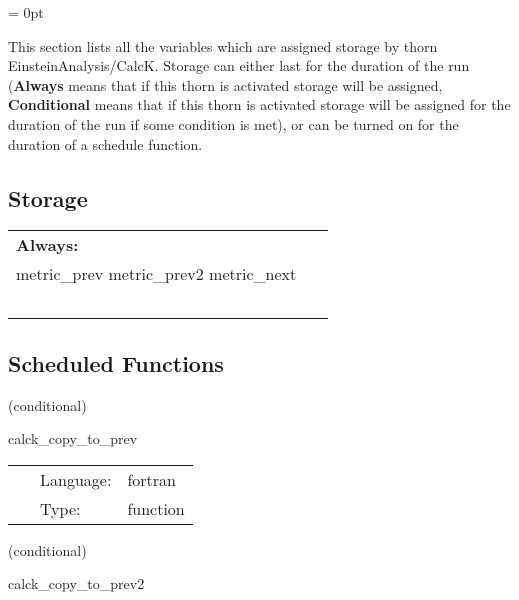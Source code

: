 \parskip = 0pt


\noindent This section lists all the variables which are assigned storage by thorn EinsteinAnalysis/CalcK.  Storage can either last for the duration of the run ({\bf Always} means that if this thorn is activated storage will be assigned, {\bf Conditional} means that if this thorn is activated storage will be assigned for the duration of the run if some condition is met), or can be turned on for the duration of a schedule function.


\subsection*{Storage}

\hspace{5mm}

 \begin{tabular*}{160mm}{ll} 

{\bf Always:}&  ~ \\ 
 metric\_prev metric\_prev2 metric\_next & ~\\ 
~ & ~\\ 
\end{tabular*} 


\subsection*{Scheduled Functions}
\vspace{5mm}

   (conditional) 

\hspace{5mm} calck\_copy\_to\_prev 

\hspace{5mm}{\it copy admbase::metric to calck::metric\_prev } 


\hspace{5mm}

 \begin{tabular*}{160mm}{cll} 
~ & Language:  & fortran \\ 
~ & Type:  & function \\ 
\end{tabular*} 


\vspace{5mm}

   (conditional) 

\hspace{5mm} calck\_copy\_to\_prev2 

